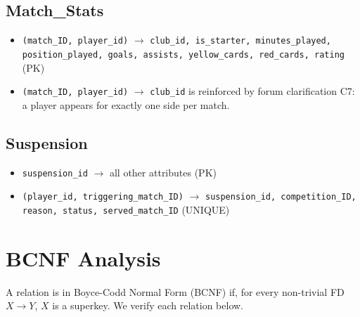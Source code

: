 \documentclass[11pt]{article}
\begin{document}
\subsection*{Match\_Stats}
\begin{itemize}[leftmargin=*]
  \item \texttt{(match\_ID, player\_id)} $\to$ \texttt{club\_id, is\_starter, minutes\_played,
    position\_played, goals, assists, yellow\_cards, red\_cards, rating} \hfill (PK)
  \item \texttt{(match\_ID, player\_id)} $\to$ \texttt{club\_id} is reinforced
    by forum clarification C7: a player appears for exactly one side per match.
\end{itemize}

\subsection*{Suspension}
\begin{itemize}[leftmargin=*]
  \item \texttt{suspension\_id} $\to$ all other attributes \hfill (PK)
  \item \texttt{(player\_id, triggering\_match\_ID)} $\to$ \texttt{suspension\_id, competition\_ID, reason, status, served\_match\_ID} \hfill (UNIQUE)
\end{itemize}

\section{BCNF Analysis}

A relation is in Boyce-Codd Normal Form (BCNF) if, for every non-trivial
FD $X \to Y$, $X$ is a superkey. We verify each relation below.
\end{document}
